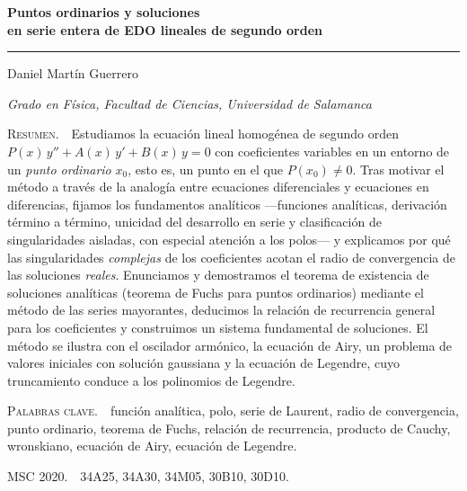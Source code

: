 \documentclass[a4paper,11pt,twoside]{article}
\newcommand{\Universidad}{Universidad de Salamanca}
\newcommand{\Facultad}{Facultad de Ciencias}
\newcommand{\Titulacion}{Grado en Física}
\newcommand{\Asignatura}{Ecuaciones Diferenciales}
\newcommand{\NumTema}{Tema 5}
\newcommand{\miNombre}{Daniel Martín Guerrero}
\begin{document}

\clearpage
{}
\setcounter{page}{1}

\thispagestyle{plain}
\begin{center}
  {\color{gris}\scshape\small\textls[120]{\Asignatura\ \,·\ \,\NumTema}}\par\vspace{10pt}
  {\color{blanco}\LARGE\bfseries Puntos ordinarios y soluciones\\[3pt]
   en serie entera de EDO lineales de segundo orden}\par\vspace{12pt}
  {\color{cian}\rule{2.8cm}{0.6pt}}\par\vspace{10pt}
  {\large\color{texto}\miNombre}\par\vspace{2pt}
  {\small\itshape\color{gris}\Titulacion, \Facultad, \Universidad}\par
\end{center}
\vspace{14pt}

\begin{center}
\begin{minipage}{0.86\textwidth}
\small
{\scshape\color{cian}Resumen.}\ \
Estudiamos la ecuación lineal homogénea de segundo orden
$P(x)\,y''+A(x)\,y'+B(x)\,y=0$ con coeficientes variables en un entorno de
un \emph{punto ordinario} $x_0$, esto es, un punto en el que $P(x_0)\neq 0$.
Tras motivar el método a través de la analogía entre ecuaciones diferenciales
y ecuaciones en diferencias, fijamos los fundamentos analíticos
---funciones analíticas, derivación término a término, unicidad del
desarrollo en serie y clasificación de singularidades aisladas, con especial
atención a los polos--- y explicamos por qué las singularidades
\emph{complejas} de los coeficientes acotan el radio de convergencia de las
soluciones \emph{reales}. Enunciamos y demostramos el teorema de existencia
de soluciones analíticas (teorema de Fuchs para puntos ordinarios) mediante
el método de las series mayorantes, deducimos la relación de recurrencia
general para los coeficientes y construimos un sistema fundamental de
soluciones. El método se ilustra con el oscilador armónico, la ecuación de
Airy, un problema de valores iniciales con solución gaussiana y la ecuación
de Legendre, cuyo truncamiento conduce a los polinomios de Legendre.

\medskip
{\scshape\color{cian}Palabras clave.}\ \
función analítica, polo, serie de Laurent, radio de convergencia, punto
ordinario, teorema de Fuchs, relación de recurrencia, producto de Cauchy,
wronskiano, ecuación de Airy, ecuación de Legendre.

\medskip
{\scshape\color{cian}MSC 2020.}\ \ 34A25, 34A30, 34M05, 30B10, 30D10.
\end{minipage}
\end{center}
\end{document}
